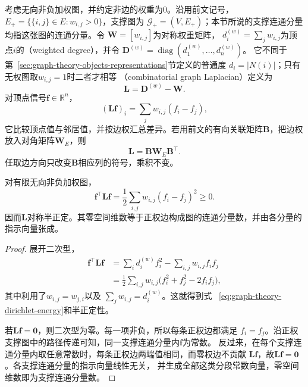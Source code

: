 考虑无向非负加权图，并约定非边的权重为\(0\)。沿用前文记号，
\(E_+=\{\{i,j\}\in E:w_{i,j}>0\}\)，支撑图为
\(\mathcal{G}_+=(V,E_+)\)；本节所说的支撑连通分量均指这张图的连通分量。令
\(\bm{W}=[w_{i,j}]\)为对称权重矩阵，
\(d_i^{(w)}=\sum_jw_{i,j}\)为顶点\(i\)的（weighted degree），并令
\(\bm{D}^{(w)}=\operatorname{diag}(d_1^{(w)},\ldots,d_n^{(w)})\)。
它不同于第~\ref{sec:graph-theory-objects-representations}节定义的普通度
\(d_i=|N(i)|\)；只有无权图取\(w_{i,j}=1\)时二者才相等
（combinatorial graph Laplacian）定义为
\begin{equation}
  \bm{L}=\bm{D}^{(w)}-\bm{W}.
  \label{eq:graph-theory-combinatorial-laplacian}
\end{equation}
对顶点信号\(\bm{f}\in\mathbb{R}^n\)，
\[
  (\bm{L}\bm{f})_i=\sum_jw_{i,j}(f_i-f_j),
\]
它比较顶点值与邻居值，并按边权汇总差异。若用前文的有向关联矩阵\(\bm{B}\)，把边权
放入对角矩阵\(\bm{W}_E\)，则
\[
  \bm{L}=\bm{B}\bm{W}_E\bm{B}^{\top}.
\]
任取边方向只改变\(\bm{B}\)相应列的符号，乘积不变。

\begin{theorem}[图拉普拉斯的Dirichlet能量与零空间]
  \label{thm:graph-theory-laplacian-energy-nullspace}
  对有限无向非负加权图，
  \begin{equation}
    \bm{f}^{\top}\bm{L}\bm{f}
    =\frac12\sum_{i,j}w_{i,j}(f_i-f_j)^2\geq0.
    \label{eq:graph-theory-dirichlet-energy}
  \end{equation}
  因而\(\bm{L}\)对称半正定。其零空间维数等于正权边构成图的连通分量数，并由各分量的
  指示向量张成。
\end{theorem}

\begin{proof}
展开二次型，
\begin{align*}
  \bm{f}^{\top}\bm{L}\bm{f}
  &=
  \sum_i d_i^{(w)}f_i^2-\sum_{i,j}w_{i,j}f_if_j\\
  &=
  \frac12\sum_{i,j}w_{i,j}
  \bigl(f_i^2+f_j^2-2f_if_j\bigr),
\end{align*}
其中利用了\(w_{i,j}=w_{j,i}\)以及
\(\sum_jw_{i,j}=d_i^{(w)}\)。这就得到式
~\eqref{eq:graph-theory-dirichlet-energy}和半正定性。

若\(\bm{L}\bm{f}=\bm{0}\)，则二次型为零。每一项非负，所以每条正权边都满足
\(f_i=f_j\)。沿正权支撑图中的路径传递可知，同一支撑连通分量内\(\bm{f}\)为常数。
反过来，在每个支撑连通分量内取任意常数时，每条正权边两端值相同，而零权边不贡献
\(\bm{L}\bm{f}\)，故\(\bm{L}\bm{f}=\bm{0}\)。各支撑连通分量的指示向量线性无关，
并生成全部这类分段常数向量，零空间维数即为支撑连通分量数。
\end{proof}


